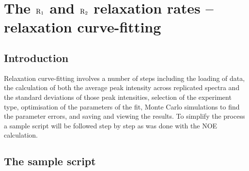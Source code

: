 
\chapter{The $\mathrm{R}_1$ and $\mathrm{R}_2$ relaxation rates -- relaxation curve-fitting}




\section{Introduction}

Relaxation curve-fitting involves a number of steps including the loading of data, the calculation of both the average peak intensity across replicated spectra and the standard deviations of those peak intensities, selection of the experiment type, optimisation of the parameters of the fit, Monte Carlo simulations to find the parameter errors, and saving and viewing the results.  To simplify the process a sample script will be followed step by step as was done with the NOE calculation.




\section{The sample script}

